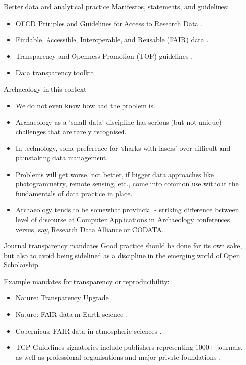 \documentclass[aspectratio=169, 11pt]{beamer} %
\begin{document}
\begin{frame}{Better data and analytical practice}
  Manifestos, statements, and guidelines:
    \begin{itemize}[label=\textbullet]
        \item OECD Priniples and Guidelines for Access to Research Data \cite{Oecd2007-vi}.
        \item Findable, Accessible, Interoperable, and Reusable (FAIR) data \cite{Wilkinson2016-mr, Go-fair2017-vs}.
        \item Transparency and Openness Promotion (TOP) guidelines \cite{Nosek2015-wm, Cos2019-mr}.
        \item Data transparency toolkit \cite{Perkel2018-rw}.
    \end{itemize}
\end{frame}

\begin{frame}{Archaeology in this context}
    \begin{itemize}[label=\textbullet]
        \item We do not even know how bad the problem is.
        \item Archaeology as a `small data' discipline has serious (but not unique) challenges that are rarely recognised.
        \item In technology, some preference for `sharks with lasers' over difficult and painstaking data management. 
        \item Problems will get worse, not better, if bigger data approaches like photogrammetry, remote sensing, etc., come into common use without the fundamentals of data practice in place.
        \item Archaeology tends to be somewhat provincial - striking difference between level of discourse at Computer Applications in Archaeology conferences versus, say, Research Data Alliance or CODATA. 
    \end{itemize}
\end{frame}

\begin{frame}{Journal transparency mandates}
  Good practice should be done for its own sake, but also to avoid being sidelined as a discipline in the emerging world of Open Scholarship. \par
  Example mandates for transparency or reproducibility:
    \begin{itemize}[label=\textbullet]
        \item Nature: Transparency Upgrade \cite{Nature2017-lq}.
        \item Nature: FAIR data in Earth science \cite{Nature2019-ng}.
        \item Copernicus: FAIR data in atmospheric sciences \cite{Van_Edig2018-bu}.
        \item TOP Guidelines signatories include publishers representing 1000+ journals, as well as professional organisations and major private foundations  \cite{Cos2019-mr}.
    \end{itemize}
\end{frame}
\end{document}
